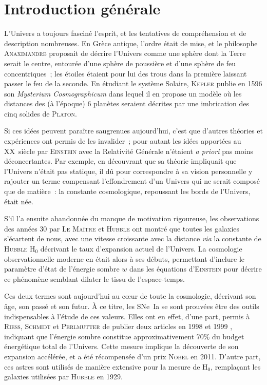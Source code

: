 \documentclass[../main/main.tex]{subfiles}
\begin{document}
\chapter*{Introduction g\'en\'erale}

L'Univers a toujours fasciné l'esprit, et les tentatives de compréhension et de
description nombreuses. En Grèce antique, l'ordre était de mise, et le
philosophe \textsc{Anaximandre} proposait de décrire l'Univers comme une sphère
dont la Terre serait le centre, entourée d'une sphère de poussière et d'une
sphère de feu concentriques~; les étoiles étaient pour lui des trous dans la
première laissant passer le feu de la seconde. En étudiant le système Solaire,
\textsc{Kepler} publie en 1596 son \textit{Mysterium Cosmographicum} dans lequel
il en propose un modèle où les distances des (à l'époque) 6 planètes seraient
décrites par une imbrication des cinq solides de \textsc{Platon}.

Si ces idées peuvent paraître saugrenues aujourd'hui, c'est que d'autres
théories et expériences ont permis de les invalider~; pour autant les idées
apportées au XX\ieme\ siècle par \textsc{Einstein} avec la Relativité Générale
\citep{einstein1915} n'étaient \textit{a priori} pas moins déconcertantes. Par
exemple, en découvrant que sa théorie impliquait que l'Univers n'était pas
statique, il dû pour correspondre à sa vision personnelle y rajouter un terme
compensant l'effondrement d'un Univers qui ne serait composé que de matière~: la
constante cosmologique, repoussant les bords de l'Univers, était née.

S'il l'a ensuite abandonnée du manque de motivation rigoureuse, les observations
des années 30 par \textsc{Le Maître} et \textsc{Hubble} \citep{hubble1929} ont
montré que toutes les galaxies s'écartent de nous, avec une vitesse croissante
avec la distance \textit{via} la constante de \textsc{Hubble} H$_0$ décrivant le
taux d'expansion actuel de l'Univers. La cosmologie observationnelle moderne en
était alors à ses débuts, permettant d'inclure le paramètre d'état de l'énergie
sombre $w$ dans les équations d'\textsc{Einstein} pour décrire ce phénomène
semblant dilater le tissu de l'espace-temps.

Ces deux termes sont aujourd'hui au cœur de toute la cosmologie, décrivant son
âge, son passé et son futur. À ce titre, les SNe~Ia se sont prouvées être des
outils indispensables à l'étude de ces valeurs. Elles ont en effet, d'une part,
permis à \textsc{Riess}, \textsc{Schmidt} et \textsc{Perlmutter} de publier deux
articles en 1998 et 1999 \citep{riess1998, perlmutter1999}, indiquant que
l'énergie sombre constitue approximativement 70\% du budget énergétique total de
l'Univers. Cette mesure implique la découverte de son expansion accélérée, et a
été récompensée d'un prix \textsc{Nobel} en 2011. D'autre part, ces astres sont
utilisés de manière extensive pour la mesure de H$_0$, remplaçant les galaxies
utilisées par \textsc{Hubble} en 1929.
\end{document}
